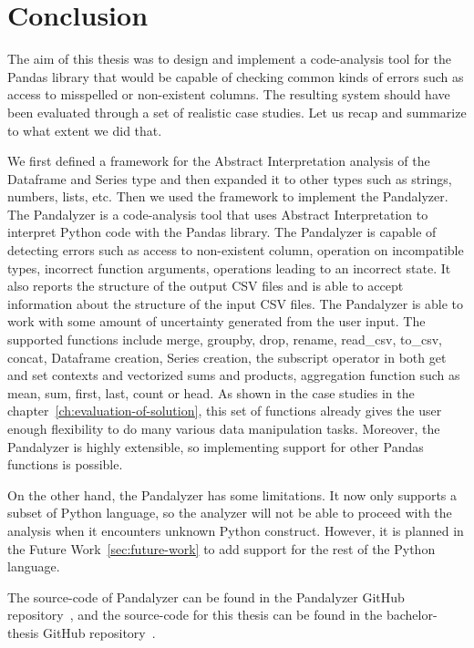 \chapter*{Conclusion}

The aim of this thesis was to design and implement a code-analysis tool for the Pandas library that would be capable of
checking common kinds of errors such as access to misspelled or non-existent columns.
The resulting system should have been evaluated through a set of realistic case studies.
Let us recap and summarize to what extent we did that.

We first defined a framework for the Abstract Interpretation analysis of the Dataframe and Series type and then expanded it
to other types such as strings, numbers, lists, etc.
Then we used the framework to implement the Pandalyzer.
The Pandalyzer is a code-analysis tool that uses Abstract Interpretation to interpret Python code with the Pandas
library.
The Pandalyzer is capable of detecting errors such as access to non-existent column, operation on incompatible types,
incorrect function arguments, operations leading to an incorrect state.
It also reports the structure of the output CSV files and is able to accept information about the structure of the input CSV files.
The Pandalyzer is able to work with some amount of uncertainty generated from the user input.
The supported functions include merge, groupby, drop, rename, read\_csv, to\_csv, concat, Dataframe creation,
Series creation, the subscript operator in both get and set contexts and vectorized sums and products, aggregation function
such as mean, sum, first, last, count or head.
As shown in the case studies in the chapter~\ref{ch:evaluation-of-solution}, this set of functions already gives
the user enough flexibility to do many various data manipulation tasks.
Moreover, the Pandalyzer is highly extensible, so implementing support for other Pandas functions is possible.

On the other hand, the Pandalyzer has some limitations.
It now only supports a subset of Python language, so the analyzer will not be able to proceed with the analysis when
it encounters unknown Python construct.
However, it is planned in the Future Work~\ref{sec:future-work} to add support for the rest of the Python language.

The source-code of Pandalyzer can be found in the Pandalyzer GitHub repository~\cite{pandalyzer}, and the source-code
for this thesis can be found in the bachelor-thesis GitHub repository~\cite{bachelor-thesis}.

